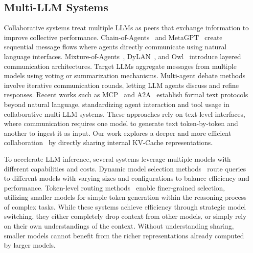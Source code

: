 \subsection{Multi-LLM Systems}
Collaborative systems treat multiple LLMs as peers that exchange information to improve collective performance. 
Chain-of-Agents~\citep{zhang2024chain} and MetaGPT~\citep{hong2024metagpt} create sequential message flows where agents directly communicate using natural language interfaces. 
Mixture-of-Agents~\citep{wang2024moa}, DyLAN~\citep{liu2024dylan}, and Owl~\citep{hu2025owl} introduce layered communication architectures. Target LLMs aggregate messages from multiple models using voting or summarization mechanisms.
Multi-agent debate methods~\citep{estornell2024multi, liang2024encouraging, du2023improving} involve iterative communication rounds, letting LLM agents discuss and refine responses.
Recent works such as MCP~\cite{anthropic2024mcp} and A2A~\cite{google2025a2a} establish formal text protocols beyond natural language, standardizing agent interaction and tool usage in collaborative multi-LLM systems. 
These approaches rely on text-level interfaces, where communication requires one model to generate text token-by-token and another to ingest it as input. 
Our work explores a deeper and more efficient collaboration~\citep{gibberlink, zheng2025thought} by directly sharing internal KV-Cache representations.

To accelerate LLM inference, several systems leverage multiple models with different capabilities and costs. 
Dynamic model selection methods~\citep{OpenAI2025GPT5, ong2024routellm, feng2024graphrouter, ning2024sot} route queries to different models with varying sizes and configurations to balance efficiency and performance. 
Token-level routing methods~\citep{zhang2024fast, shen2024learning, zheng2025citer, fu2025r2r} enable finer-grained selection, utilizing smaller models for simple token generation within the reasoning process of complex tasks. 
While these systems achieve efficiency through strategic model switching, they either completely drop context from other models, or simply rely on their own understandings of the context. 
Without understanding sharing, smaller models cannot benefit from the richer representations already computed by larger models.